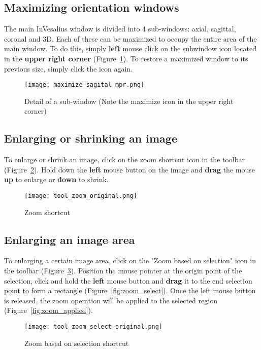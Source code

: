 \subsection{Maximizing orientation windows}

The main InVesalius window is divided into 4 sub-windows: axial, sagittal, coronal and 3D. Each of these can be maximized to occupy the entire area of the main window. To do this, simply \textbf{left} mouse click on the subwindow icon located in the \textbf{upper right corner} (Figure~\ref{fig:maximize_window}). To restore a maximized window to its previous size, simply click the icon again.

\begin{figure}[!htb]
\centering
\texttt{[image: maximize\_sagital\_mpr.png]}
\caption{Detail of a sub-window (Note the maximize icon in the upper right corner)}
\label{fig:maximize_window}
\end{figure}

\subsection{Enlarging or shrinking an image}

To enlarge or shrink an image, click on the zoom shortcut icon in the toolbar (Figure~\ref{fig:zoom_icon}). Hold down the \textbf{left} mouse button on the image and \textbf{drag} the mouse \textbf{up} to enlarge or \textbf{down} to shrink.

\begin{figure}[!htb]
\centering
\texttt{[image: tool\_zoom\_original.png]}
\caption{Zoom shortcut}
\label{fig:zoom_icon}
\end{figure}

\subsection{Enlarging an image area}

To enlarging a certain image area, click on the "Zoom based on selection" icon in the toolbar (Figure~\ref{fig:zoom_icon_loc}). Position the mouse pointer at the origin point of the selection, click and hold the \textbf{left} mouse button and \textbf{drag} it to the end selection point to form a rectangle (Figure~\ref{fig:zoom_select}). Once the left mouse button is released, the zoom operation will be applied to the selected region (Figure~\ref{fig:zoom_applied}).

\begin{figure}[!htb]
\centering
\texttt{[image: tool\_zoom\_select\_original.png]}
\caption{Zoom based on selection shortcut}
\label{fig:zoom_icon_loc}
\end{figure}

